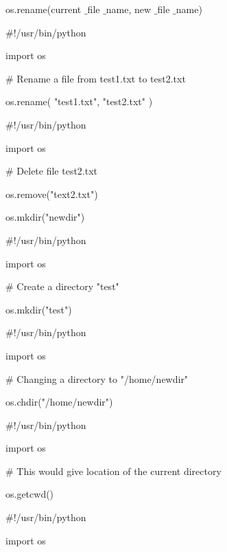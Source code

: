 \noindent 
os.rename(current $  \_  $file $  \_  $name, new $  \_  $file $  \_  $name) \par
\vspace{12pt}
\noindent 
$  \#  $!/usr/bin/python \par
\noindent 
import os \par
\vspace{12pt}
\noindent 
$  \#  $ Rename a file from test1.txt to test2.txt \par
\noindent 
os.rename( "test1.txt", "test2.txt" ) \par
\vspace{12pt}
\noindent 
$  \#  $!/usr/bin/python \par
\noindent 
import os \par
\vspace{12pt}
\noindent 
$  \#  $ Delete file test2.txt \par
\noindent 
os.remove("text2.txt") \par
\vspace{12pt}
\noindent 
os.mkdir("newdir") \par
\vspace{12pt}
\noindent 
$  \#  $!/usr/bin/python \par
\noindent 
import os \par
\vspace{12pt}
\noindent 
$  \#  $ Create a directory "test" \par
\noindent 
os.mkdir("test") \par
\vspace{12pt}
\noindent 
$  \#  $!/usr/bin/python \par
\noindent 
import os \par
\vspace{12pt}
\noindent 
$  \#  $ Changing a directory to "/home/newdir" \par
\noindent 
os.chdir("/home/newdir") \par
\vspace{12pt}
\noindent 
$  \#  $!/usr/bin/python \par
\noindent 
import os \par
\vspace{12pt}
\noindent 
$  \#  $ This would give location of the current directory \par
\noindent 
os.getcwd() \par
\vspace{12pt}
\noindent 
$  \#  $!/usr/bin/python \par
\noindent 
import os \par
